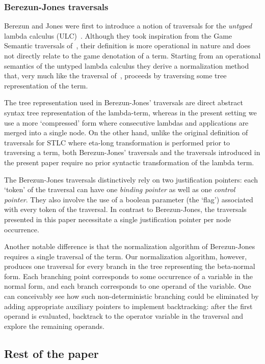 \documentclass{article}
\theoremstyle{definition}
\begin{document}
\subsubsection{Berezun-Jones traversals}
Berezun and Jones were first to introduce a notion of traversals for the \emph{untyped} lambda calculus (ULC)~\cite{JonesBerezunLLL}. Although they took inspiration from the Game Semantic traversals of~\cite{Ong2006,BlumGalop2008}, their definition is more operational in nature and does not directly relate to the game denotation of a term. Starting from an operational semantics of the untyped lambda calculus they derive a normalization method that, very much like the traversal of~\cite{Ong2006, BlumPhd}, proceeds by traversing some tree representation of the term.

The tree representation used in Berezun-Jones' traversals are direct abstract syntax tree representation of the lambda-term, whereas in the present setting we use a more `compressed' form where consecutive lambdas and applications are merged into a single node. On the other hand, unlike the original definition of traversals for STLC where eta-long transformation is performed prior to traversing a term, both Berezun-Jones' traversals and the traversals introduced in the present paper require no prior syntactic transformation of the lambda term.

The Berezun-Jones traversals distinctively rely on two justification pointers: each `token' of the traversal can have one \emph{binding pointer} as well as one \emph{control pointer}. They also involve the use of a boolean parameter (the `flag') associated with every token of the traversal. In contrast to Berezun-Jones, the traversals presented in this paper necessitate a single justification pointer per node occurrence.

Another notable difference is that the normalization algorithm of Berezun-Jones requires a single traversal of the term. Our normalization algorithm, however, produces one traversal for every branch in the tree representing the beta-normal form. Each branching point corresponds to some occurrence of a variable in the normal form, and each branch corresponds to one operand of the variable. One can conceivably see how such non-deterministic branching could be eliminated by adding appropriate auxiliary pointers to implement backtracking: after the first operand is evaluated, backtrack to the operator variable in the traversal and explore the remaining operands.

\subsection{Rest of the paper}
\end{document}
